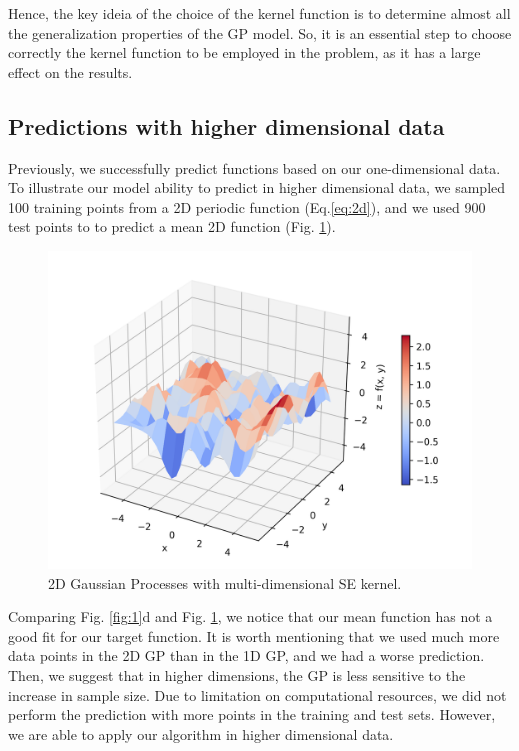\documentclass{article}
\begin{document}
Hence, the key ideia of the choice of the kernel function is to determine almost all the generalization properties of the GP model. So, it is an essential step to choose correctly the kernel function to be employed in the problem, as it has a large effect on the results.

\subsection{Predictions with higher dimensional data}

Previously, we successfully predict functions based on our one-dimensional data. To illustrate our model ability to predict in higher dimensional data, we sampled 100 training points from a 2D periodic function (Eq.\eqref{eq:2d}), and we used 900 test points to to predict a mean 2D function (Fig. \ref{fig:GP2D}).

\begin{figure}
  \centering
  \includegraphics[width=\linewidth]{GP2D/posterior.png}
  \caption{2D Gaussian Processes with multi-dimensional SE kernel.}
  \label{fig:GP2D}
\end{figure}

Comparing Fig. \ref{fig:1}d and Fig. \ref{fig:GP2D}, we notice that our mean function has not a good fit for our target function. It is worth mentioning that we used much more data points in the 2D GP than in the 1D GP, and we had a worse prediction. Then, we suggest that in higher dimensions, the GP is less sensitive to the increase in sample size. Due to limitation on computational resources, we did not perform the prediction with more points in the training and test sets. However, we are able to apply our algorithm in higher dimensional data.
\end{document}
